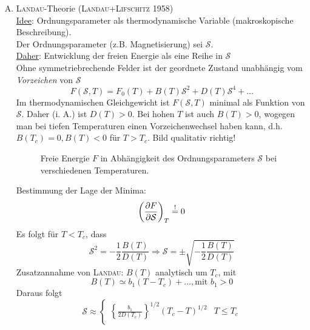 \begin{enumerate}[A)]
    \item \textsc{Landau}-Theorie (\textsc{Landau+Lifschitz} 1958) \\
    \underline{Idee}: Ordnungsparameter als thermodynamische Variable (makroskopische Beschreibung). \\
    Der Ordnungsparameter (z.B. Magnetisierung) sei $\mathcal{S}$. \\
    \underline{Daher}: Entwicklung der freien Energie als eine Reihe in $\mathcal{S}$ \\
    Ohne symmetriebrechende Felder ist der geordnete Zustand unabhängig vom \emph{Vorzeichen} von $\mathcal{S}$
    \begin{equation}
        F(\mathcal{S}, T) = F_0 (T) + B(T) \mathcal{S}^2 + D(T) \mathcal{S}^4 + \ldots
    \end{equation}
    Im thermodynamischen Gleichgewicht ist $F(\mathcal{S}, T)$ minimal als Funktion von $\mathcal{S}$. Daher (i. A.) ist $D(T)>0$.
    Bei hohen $T$ ist auch $B(T)>0$, wogegen man bei tiefen Temperaturen einen Vorzeichenwechsel haben kann,
    d.h. $B(T_c) = 0, B(T)<0$ für $T>T_c$. Bild qualitativ richtig!
    \begin{figure}[H]
        \centering
        \def\svgwidth{0.5\textwidth}
        
        \caption{Freie Energie $F$ in Abhängigkeit des Ordnungsparameters $\mathcal{S}$ bei verschiedenen Temperaturen.}
        \label{img:F_S_Diag}
\end{figure}
    Bestimmung der Lage der Minima:
    \begin{equation}
        \left( \frac{\partial F}{\partial \mathcal{S}} \right)_{T} \overset{!}{=} 0
    \end{equation}
    Es folgt für $T < T_c$, dass
    \begin{equation}
        \mathcal{S}^2 = - \frac{1}{2} \frac{B(T)}{D(T)} \Rightarrow \mathcal{S} = \pm \sqrt{- \frac{1}{2} \frac{B(T)}{D(T)}}
    \end{equation}
    Zusatzannahme von \textsc{Landau}: $B(T)$ analytisch um $T_c$, mit
    \begin{equation}
        B(T) \simeq b_1 (T - T_c) + \ldots, \text{mit } b_1 > 0
    \end{equation}
    Daraus folgt
    \begin{equation}
        \mathcal{S} \approx
        \begin{cases}
            \left\{ \frac{b_1}{2 D(T_c)} \right\}^{1/2} (T_c - T)^{1/2} & T \leq T_c \\

\end{cases}
\end{equation}
\end{enumerate}
